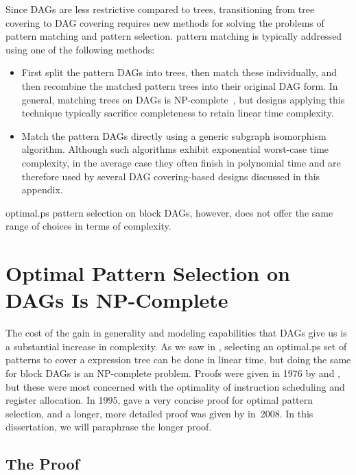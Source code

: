 Since \glspl{DAG} are less restrictive compared to \glspl{tree}, transitioning
from \gls{tree covering} to \gls{DAG covering} requires new methods for solving
the problems of \gls{pattern matching} and \gls{pattern selection}.
%
\Gls{pattern matching} is typically addressed using one of the following
methods:
%
\begin{itemize}
  \item First split the \glspl{pattern DAG} into \glspl{tree}, then match these
    individually, and then recombine the matched \glspl{pattern tree} into their
    original \gls{DAG} form.
    In general, matching \glspl{tree} on \glspl{DAG} is
    NP-complete~\cite{GareyJohnson:1979}, but designs applying this technique
    typically sacrifice completeness to retain linear time complexity.
  \item Match the \glspl{pattern DAG} directly using a generic \gls{subgraph
    isomorphism} algorithm.
    Although such algorithms exhibit exponential worst-case time complexity, in
    the average case they often finish in polynomial time and are therefore used
    by several \gls{DAG covering}-based designs discussed in this appendix.
\end{itemize}

\Gls{optimal.ps} \gls{pattern selection} on \glspl{block DAG}, however, does not
offer the same range of choices in terms of complexity.


\section{Optimal Pattern Selection on DAGs Is NP-Complete}

The cost of the gain in generality and modeling capabilities that \glspl{DAG}
give us is a substantial increase in complexity.
%
As we saw in , selecting an \gls{optimal.ps} set of
\glspl{pattern} to cover a \gls{expression tree} can be done in linear time, but
doing the same for \glspl{block DAG} is an NP-complete problem.
%
Proofs were given in 1976 by \textcite{BrunoSethi:1976} and
\textcite{AhoEtAl:1976}, but these were most concerned with the optimality of
\gls{instruction scheduling} and \gls{register allocation}.
%
In 1995, \textcite{Proebsting:1995:Proof} gave a very concise proof for optimal
\gls{pattern selection}, and a longer, more detailed proof was given by
\textcite{KoesGoldstein:2008} in~2008.
%
In this dissertation, we will paraphrase the longer proof.


\subsection{The Proof}

